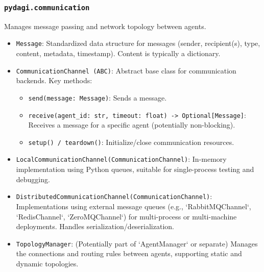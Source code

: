 \documentclass[12pt]{amsart}
\begin{document}
\subsubsection{\texttt{pydagi.communication}}
Manages message passing and network topology between agents.
\begin{itemize}[leftmargin=*]
    \item \texttt{Message}: Standardized data structure for messages (sender, recipient(s), type, content, metadata, timestamp). Content is typically a dictionary.
    \item \texttt{CommunicationChannel (ABC)}: Abstract base class for communication backends. Key methods:
        \begin{itemize}
            \item \texttt{send(message: Message)}: Sends a message.
            \item \texttt{receive(agent_id: str, timeout: float) -> Optional[Message]}: Receives a message for a specific agent (potentially non-blocking).
            \item \texttt{setup() / teardown()}: Initialize/close communication resources.
        \end{itemize}
    \item \texttt{LocalCommunicationChannel(CommunicationChannel)}: In-memory implementation using Python queues, suitable for single-process testing and debugging.
    \item \texttt{DistributedCommunicationChannel(CommunicationChannel)}: Implementations using external message queues (e.g., `RabbitMQChannel`, `RedisChannel`, `ZeroMQChannel`) for multi-process or multi-machine deployments. Handles serialization/deserialization.
    \item \texttt{TopologyManager}: (Potentially part of `AgentManager` or separate) Manages the connections and routing rules between agents, supporting static and dynamic topologies.
\end{itemize}
\end{document}
